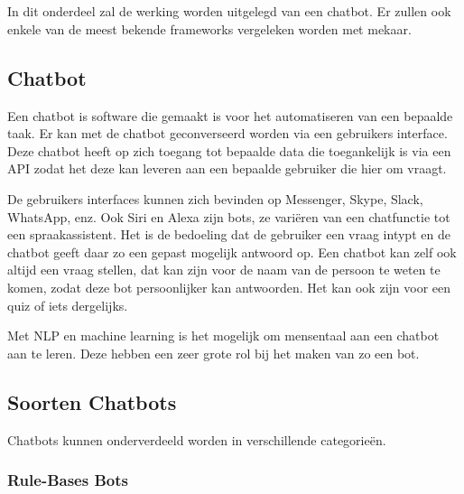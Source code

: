 \chapter{}
\label{ch:stand-van-zaken}



In dit onderdeel zal de werking worden uitgelegd van een chatbot. Er zullen ook enkele van de meest bekende frameworks vergeleken worden met mekaar.

\section{Chatbot}
\label{sec:Chatbot}

Een chatbot is software die gemaakt is voor het automatiseren van een bepaalde taak. Er kan met de chatbot geconverseerd worden via een gebruikers interface. Deze chatbot heeft op zich toegang tot bepaalde data die toegankelijk is via een API zodat het deze kan leveren aan een bepaalde gebruiker die hier om vraagt.

De gebruikers interfaces kunnen zich bevinden op Messenger, Skype, Slack, WhatsApp, enz. Ook Siri en Alexa zijn bots, ze variëren van een chatfunctie tot een spraakassistent. Het is de bedoeling dat de gebruiker een vraag intypt en de chatbot geeft daar zo een gepast mogelijk antwoord op. Een chatbot kan zelf ook altijd een vraag stellen, dat kan zijn voor de naam van de persoon te weten te komen, zodat deze bot persoonlijker kan antwoorden. Het kan ook zijn voor een quiz of iets dergelijks.

Met NLP en machine learning is het mogelijk om mensentaal aan een chatbot aan te leren. Deze hebben een zeer grote rol bij het maken van zo een bot. ~\autocite{assaf2017}

\section{Soorten Chatbots}
\label{sec:Soorten Chatbots}

Chatbots kunnen onderverdeeld worden in verschillende categorieën.

\subsection{Rule-Bases Bots}
\label{Rule-Bases Bots}

